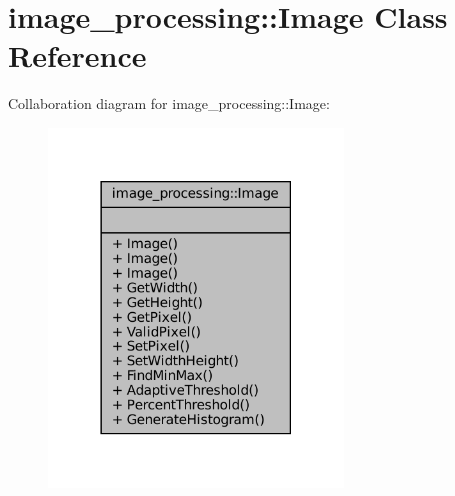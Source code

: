 \hypertarget{classimage__processing_1_1Image}{}\section{image\+\_\+processing\+:\+:Image Class Reference}
\label{classimage__processing_1_1Image}


Collaboration diagram for image\+\_\+processing\+:\+:Image\+:
\nopagebreak
\begin{figure}[H]
\begin{center}
\leavevmode
\includegraphics[width=222pt]{classimage__processing_1_1Image__coll__graph}
\end{center}
\end{figure}

